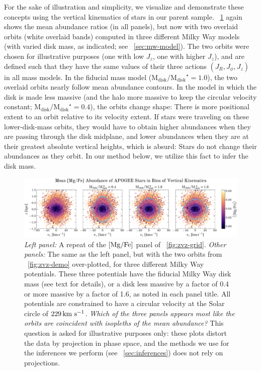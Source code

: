 \documentclass[modern]{aastex63}
\newcommand{\mdisk}{\ensuremath{\mathrm{M}_\mathrm{disk}}}
\newcommand{\mratio}{\ensuremath{\mdisk / \mdisk^\star}}
\begin{document}
For the sake of illustration and simplicity, we visualize and demonstrate these
concepts using the vertical kinematics of stars in our parent sample.
\figurename~\ref{fig:zvz-mgfe} again shows the mean  abundance
ratios (in all panels), but now with two overlaid orbits (white overlaid bands)
computed in three different Milky Way models (with varied disk mass, as
indicated; see \sectionname~\ref{sec:mw-model}).
The two orbits were chosen for illustrative purposes (one with low $J_z$, one
with higher $J_z$), and are defined such that they have the same values of their
three actions $(J_R, J_\phi, J_z)$ in all mass models.
In the fiducial mass model ($\mratio = 1.0$), the two overlaid orbits nearly
follow mean abundance contours.
In the model in which the disk is made less massive (and the halo more massive
to keep the circular velocity constant; $\mratio = 0.4$), the orbits change
shape:
There is more positional extent to an orbit relative to its velocity extent.
If stars were traveling on these lower-disk-mass orbits, they would have to
obtain higher abundances when they are passing through the disk midplane,
and lower abundances when they are at their greatest absolute vertical heights,
which is absurd: Stars do not change their abundances as they orbit.
In our method below, we utilize this fact to infer the disk mass.


\begin{figure}[!tp]
  \begin{mdframed}[style=figure]
  \begin{center}
  \includegraphics[width=\textwidth]{zvz-mean-MG_FE}
  \end{center}
  \caption{%
    \textsl{Left panel:} A repeat of the ${[\mathrm{Mg}/\mathrm{Fe}]}$ panel of
    \figurename~\ref{fig:zvz-grid}.
    \textsl{Other panels:} The same as the left panel, but with the two orbits
    from \figurename~\ref{fig:zvz-demo} over-plotted, for three different Milky
    Way potentials.
    These three potentials have the fiducial Milky Way disk mass (see text
    for details), or a disk less massive by a factor of 0.4 or more
    massive by a factor of 1.6, as noted in each panel title.
    All potentials are constrained to have a circular velocity at the
    Solar circle of $229\,\mathrm{km}~\mathrm{s}^{-1}$.
    \emph{Which of the three panels appears most like the orbits are
    coincident with isopleths of the mean abundance?}
    This question is asked for illustrative purposes only: these plots distort
    the data by projection in phase space, and the methods we use for the
    inferences we perform (see \sectionname~\ref{sec:inferences}) does not rely
    on projections.
  \label{fig:zvz-mgfe}
  }
  \end{mdframed}
\end{figure}
\end{document}
